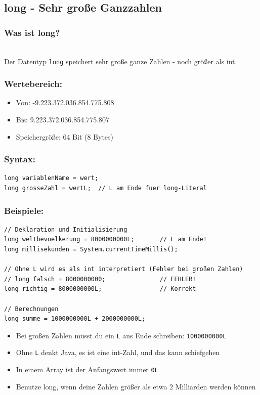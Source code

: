 \newpage


\subsection*{long - Sehr große Ganzzahlen}

\subsubsection*{Was ist long?}\\
Der Datentyp \texttt{long} speichert sehr große ganze Zahlen - noch größer als int.

\subsubsection*{Wertebereich:}
\begin{itemize}
	\item Von: -9.223.372.036.854.775.808
	\item Bis: 9.223.372.036.854.775.807
	\item Speichergröße: 64 Bit (8 Bytes)
\end{itemize}

\subsubsection*{Syntax:}
\begin{lstlisting}
long variablenName = wert;
long grosseZahl = wertL;  // L am Ende fuer long-Literal
\end{lstlisting}

\subsubsection*{Beispiele:}
\begin{lstlisting}
// Deklaration und Initialisierung
long weltbevoelkerung = 8000000000L;       // L am Ende!
long millisekunden = System.currentTimeMillis();

// Ohne L wird es als int interpretiert (Fehler bei großen Zahlen)
// long falsch = 8000000000;               // FEHLER!
long richtig = 8000000000L;                // Korrekt

// Berechnungen
long summe = 1000000000L + 2000000000L;
\end{lstlisting}

\begin{achtung}
	\begin{itemize}
		\item Bei großen Zahlen musst du ein \texttt{L} ans Ende schreiben: \texttt{1000000000L}
		\item Ohne \texttt{L} denkt Java, es ist eine int-Zahl, und das kann schiefgehen
		\item In einem Array ist der Anfangswert immer \texttt{0L}
		\item Benutze long, wenn deine Zahlen größer als etwa 2 Milliarden werden können
	\end{itemize}
\end{achtung}

